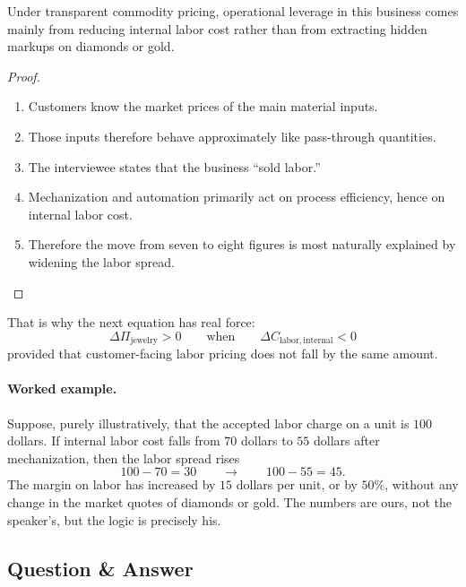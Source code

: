 \begin{proposition}
Under transparent commodity pricing, operational leverage in this business comes mainly from reducing internal labor cost rather than from extracting hidden markups on diamonds or gold.
\end{proposition}

\begin{proof}
\begin{enumerate}
\item Customers know the market prices of the main material inputs.
\item Those inputs therefore behave approximately like pass-through quantities.
\item The interviewee states that the business ``sold labor.''
\item Mechanization and automation primarily act on process efficiency, hence on internal labor cost.
\item Therefore the move from seven to eight figures is most naturally explained by widening the labor spread.
\end{enumerate}
\end{proof}

That is why the next equation has real force:
\begin{equation}
\Delta \Pi_{\mathrm{jewelry}} > 0
\qquad \text{when} \qquad
\Delta C_{\mathrm{labor,internal}} < 0
\end{equation}
provided that customer-facing labor pricing does not fall by the same amount.

\paragraph{Worked example.} Suppose, purely illustratively, that the accepted labor charge on a unit is \(100\) dollars. If internal labor cost falls from \(70\) dollars to \(55\) dollars after mechanization, then the labor spread rises
\begin{equation}
100-70 = 30
\qquad \longrightarrow \qquad
100-55 = 45.
\end{equation}
The margin on labor has increased by \(15\) dollars per unit, or by \(50\%\), without any change in the market quotes of diamonds or gold. The numbers are ours, not the speaker's, but the logic is precisely his.

\subsection{Question \& Answer}

